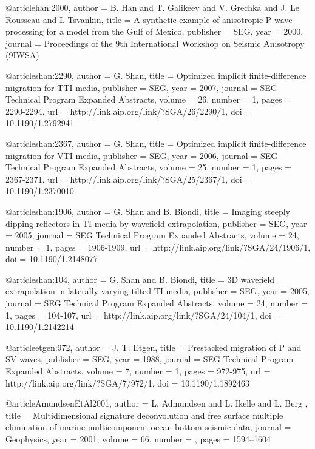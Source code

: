 {@article{han:2000,
  author =	 {B. Han and T. Galikeev and V. Grechka
                  and J. Le Rousseau and I. Tsvankin},
  title =	 {A synthetic example of anisotropic {P}-wave
                  processing for a model from the {G}ulf of {M}exico},
  publisher =	 {SEG},
  year =	 2000,
  journal =	 {Proceedings of the 9th International Workshop on
                  Seismic Anisotropy (9IWSA)}
}

@article{shan:2290,
  author =	 {G. Shan},
  title =	 {Optimized implicit finite-difference migration for
                  {TTI} media},
  publisher =	 {SEG},
  year =	 2007,
  journal =	 {SEG Technical Program Expanded Abstracts},
  volume =	 26,
  number =	 1,
  pages =	 {2290-2294},
  url =		 {http://link.aip.org/link/?SGA/26/2290/1},
  doi =		 {10.1190/1.2792941}
}

@article{shan:2367,
  author =	 {G. Shan},
  title =	 {Optimized implicit finite-difference migration for
                  {VTI} media},
  publisher =	 {SEG},
  year =	 2006,
  journal =	 {SEG Technical Program Expanded Abstracts},
  volume =	 25,
  number =	 1,
  pages =	 {2367-2371},
  url =		 {http://link.aip.org/link/?SGA/25/2367/1},
  doi =		 {10.1190/1.2370010}
}

@article{shan:1906,
  author =	 {G. Shan and B. Biondi},
  title =	 {Imaging steeply dipping reflectors in {TI} media by
                  wavefield extrapolation},
  publisher =	 {SEG},
  year =	 2005,
  journal =	 {SEG Technical Program Expanded Abstracts},
  volume =	 24,
  number =	 1,
  pages =	 {1906-1909},
  url =		 {http://link.aip.org/link/?SGA/24/1906/1},
  doi =		 {10.1190/1.2148077}
}

@article{shan:104,
  author =	 {G. Shan and B. Biondi},
  title =	 {{3D} wavefield extrapolation in laterally-varying
                  tilted {TI} media},
  publisher =	 {SEG},
  year =	 2005,
  journal =	 {SEG Technical Program Expanded Abstracts},
  volume =	 24,
  number =	 1,
  pages =	 {104-107},
  url =		 {http://link.aip.org/link/?SGA/24/104/1},
  doi =		 {10.1190/1.2142214}
}

@article{etgen:972,
  author =	 {J. T. Etgen},
  title =	 {Prestacked migration of {P} and {S}{V}-waves},
  publisher =	 {SEG},
  year =	 1988,
  journal =	 {SEG Technical Program Expanded Abstracts},
  volume =	 7,
  number =	 1,
  pages =	 {972-975},
  url =		 {http://link.aip.org/link/?SGA/7/972/1},
  doi =		 {10.1190/1.1892463}
}

@article{AmundsenEtAl2001,
author = {L. Admundsen and L. Ikelle and L. Berg },
title = {Multidimensional signature deconvolution and free surface multiple elimination of marine multicomponent ocean-bottom seismic data},
journal = {Geophysics},
year = {2001},
volume = {66},
number = {},
pages = {1594--1604}
}

}
